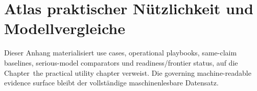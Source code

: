 \section{Atlas praktischer Nützlichkeit und Modellvergleiche}
\label{sec:oc-core-1-3-practical-utility-atlas}

Dieser Anhang materialisiert use cases, operational playbooks,
same-claim baselines, serious-model comparators und readiness/frontier status,
auf die Chapter~the practical utility chapter verweist. Die
governing machine-readable evidence surface bleibt der vollständige maschinenlesbare Datensatz.

\begingroup
\footnotesize
\RaggedRight
\setlength{\emergencystretch}{1.2em}
\setlength{\tabcolsep}{2pt}
\setlength{\LTleft}{0pt}
\setlength{\LTright}{0pt}

\endgroup
